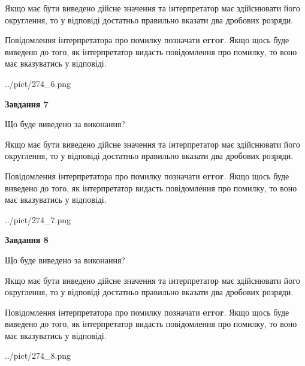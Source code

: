 \documentclass[12pt, ukrainian]{article}
\begin{document}
{\begin {Large}
Якщо має бути виведено дійсне значення та інтерпретатор має здійснювати його округлення, 
то у відповіді достатньо правильно вказати два дробових розряди.

Повідомлення інтерпретатора про помилку позначати \textbf{error}.
Якщо щось буде виведено до того, як інтерпретатор видасть повідомлення про помилку, 
то воно має вказуватись у відповіді. \par

\begin{center}
	{../pict/274_6.png}
\end{center}
\newpage

{\begin {center}\textbf{Завдання 7}\end {center}}\par
Що буде виведено за виконання? \par

Якщо має бути виведено дійсне значення та інтерпретатор має здійснювати його округлення, 
то у відповіді достатньо правильно вказати два дробових розряди.

Повідомлення інтерпретатора про помилку позначати \textbf{error}.
Якщо щось буде виведено до того, як інтерпретатор видасть повідомлення про помилку, 
то воно має вказуватись у відповіді. \par

\begin{center}
	{../pict/274_7.png}
\end{center}
\newpage

{\begin {center}\textbf{Завдання 8}\end {center}}\par
Що буде виведено за виконання? \par

Якщо має бути виведено дійсне значення та інтерпретатор має здійснювати його округлення, 
то у відповіді достатньо правильно вказати два дробових розряди.

Повідомлення інтерпретатора про помилку позначати \textbf{error}.
Якщо щось буде виведено до того, як інтерпретатор видасть повідомлення про помилку, 
то воно має вказуватись у відповіді. \par

\begin{center}
	{../pict/274_8.png}
\end{center}
\newpage


\end{Large}}
\end{document}
